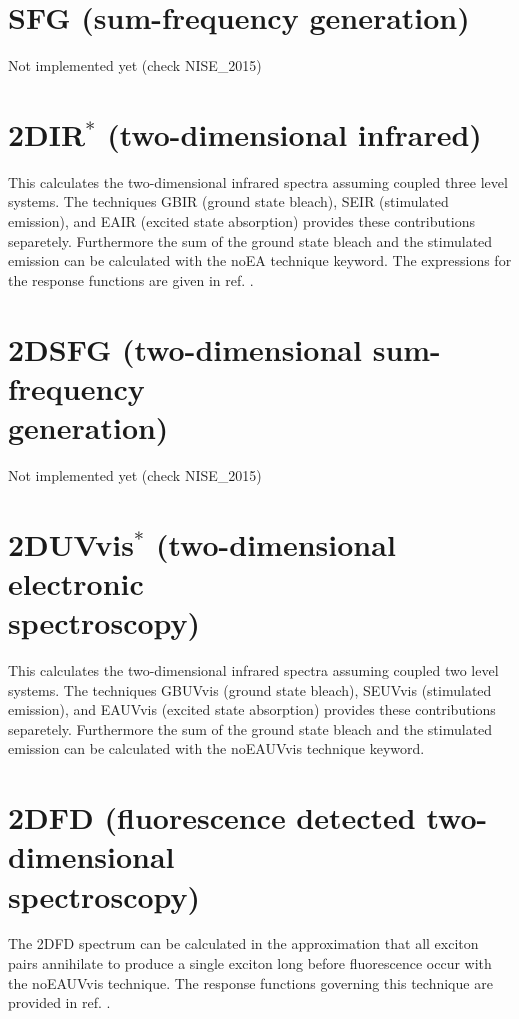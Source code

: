 \section{SFG (sum-frequency generation)}
Not implemented yet (check NISE\_2015)
\section{2DIR$^{*}$ (two-dimensional infrared)}
This calculates the two-dimensional infrared spectra assuming coupled three level systems. The techniques GBIR (ground state bleach), SEIR (stimulated emission), and EAIR (excited state absorption) provides these contributions separetely. Furthermore the sum of the ground state bleach and the stimulated emission can be calculated with the noEA technique keyword. The expressions for the response functions are given in ref. \cite{Jansen.2006.JPCB.110.22910}.
\section{2DSFG (two-dimensional sum-frequency\\ generation)}
 Not implemented yet (check NISE\_2015)
\section{2DUVvis$^{*}$ (two-dimensional electronic\\ spectroscopy)}
This calculates the two-dimensional infrared spectra assuming coupled two level systems. The techniques GBUVvis (ground state bleach), SEUVvis (stimulated emission), and EAUVvis (excited state absorption) provides these contributions separetely. Furthermore the sum of the ground state bleach and the stimulated emission can be calculated with the noEAUVvis technique keyword. 
\section{2DFD (fluorescence detected two-dimensional\\ spectroscopy)}
 The 2DFD spectrum can be calculated in the approximation that all exciton pairs annihilate to produce a single exciton long before fluorescence occur with the noEAUVvis technique. The response functions governing this technique are provided in ref. \cite{Kunsel_2018}.
